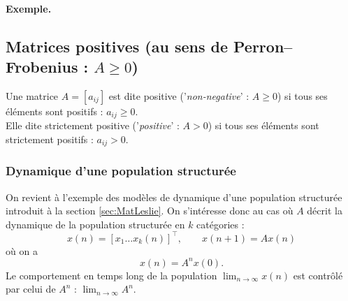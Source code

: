 \paragraph*{Exemple.} 

\subsection{Matrices positives (au sens de Perron–Frobenius : $A \geq 0$)} 


\begin{definition}
  Une matrice $A = [a_{ij}]$ est dite positive ('{\em non-negative}' : $A \geq 0$) si tous ses éléments sont positifs : $a_{ij} \geq 0$. \\
  Elle dite strictement positive ('{\em positive}' : $A > 0$) si tous ses éléments sont strictement positifs : $a_{ij} > 0$. 
\end{definition}

\subsubsection{Dynamique d'une population structurée}

On revient à l'exemple des modèles de dynamique d'une population structurée introduit à la section \ref{sec:MatLeslie}. On s'intéresse donc au cas où $A$ décrit la dynamique de la population structurée en $k$ catégories : 
$$
x(n) = [x_1 \dots x_k(n)]^\top, \qquad x(n+1) = A x(n)
$$
où on a
$$
x(n) = A^n x(0).
$$
Le comportement en temps long de la population $\lim_{n \to\infty} x(n)$ est contrôlé par celui de $A^n$ : $\lim_{n \to\infty} A^n$.


